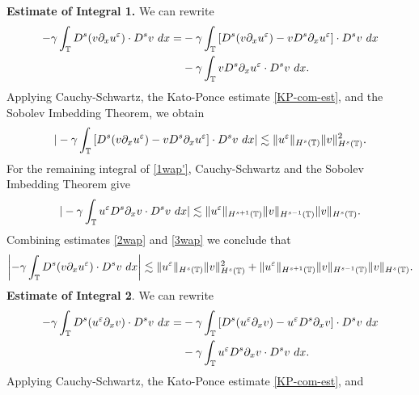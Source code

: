 {\bf Estimate of Integral 1.} We can rewrite
%
%
\begin{equation}
\begin{split}
-\gamma \int_{\mathbb{T}} D^s (v \partial_x u^\varepsilon ) \cdot D^s v \
dx = & -\gamma \int_{\mathbb{T}} \left[ D^s(v \partial_x u^\varepsilon) - v D^s
\partial_x u^\varepsilon \right] \cdot D^s v \ dx
\\
& -  \gamma \int_{\mathbb{T}} v D^s \partial_x u^\varepsilon \cdot D^s v \ dx.
\label{1wap'}
\end{split}
\end{equation}
%
%
%
%
%
%
Applying Cauchy-Schwartz, the Kato-Ponce estimate \eqref{KP-com-est}, and the Sobolev 
Imbedding Theorem, we obtain 
%
%
%
%
\begin{equation}
\begin{split}
| -\gamma \int_{\mathbb{T}} \left[ D^s(v \partial_x u^\varepsilon ) - v D^s
\partial_x u^\varepsilon \right] \cdot D^s v \ dx |
\lesssim \|u^\varepsilon \|_{H^s(\mathbb{T})} \|v\|_{H^s(\mathbb{T})}^2.
\label{2wap}
\end{split}
\end{equation}
%
%
For the remaining integral of \eqref{1wap'}, Cauchy-Schwartz and the Sobolev 
Imbedding Theorem give
%
%
%
\begin{equation}
\begin{split}
| - \gamma \int_{\mathbb{T}} u^\varepsilon D^s \partial_x v \cdot D^s v \ dx |
\lesssim \|u^\varepsilon \|_{H^{s+1}(\mathbb{T})} \|v\|_{H^{s-1}(\mathbb{T})}
\|v\|_{H^s(\mathbb{T})}.
\label{3wap}
\end{split}
\end{equation}
%
%
Combining estimates \eqref{2wap} and \eqref{3wap} we conclude that
%
%
\begin{equation}
\begin{split}
\left | -\gamma \int_{\mathbb{T}} D^s (v \partial_x u^\varepsilon ) \cdot D^s v \
dx \right | \lesssim \|u^\varepsilon \|_{H^s(\mathbb{T})} \|v\|_{H^s(\mathbb{T})}^2 + \|u^\varepsilon 
\|_{H^{s+1}(\mathbb{T})} \|v\|_{H^{s-1}(\mathbb{T})}
\|v\|_{H^s(\mathbb{T})}.
\label{4wap}
\end{split}
\end{equation}
%
%
%
{\bf Estimate of Integral 2}. We can rewrite
%
%
\begin{equation}
\begin{split}
-\gamma \int_{\mathbb{T}} D^s (u^\varepsilon \partial_x v) \cdot D^s v \
dx
= & -\gamma \int_{\mathbb{T}} \left[ D^s(u^\varepsilon \partial_x v) - u^\varepsilon D^s
\partial_x v \right] \cdot D^s v \ dx
\\
& -  \gamma \int_{\mathbb{T}} u^\varepsilon D^s \partial_x v \cdot D^s v \ dx.
\label{1wa'}
\end{split}
\end{equation}
%
%
Applying Cauchy-Schwartz, the Kato-Ponce estimate \eqref{KP-com-est}, and 

